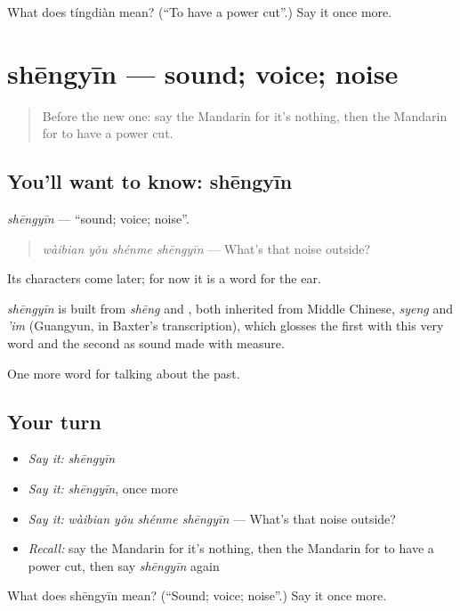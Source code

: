 \begin{tcolorbox}[breakable,colback=teal!4,colframe=teal!35!black,title={Before you move on}]
What does tíngdiàn mean? (\textquotedblleft{}To have a power cut\textquotedblright{}.) Say it once more.
\end{tcolorbox}
\section[shēngyīn]{shēngyīn — sound; voice; noise}

\label{lesson:ZH-C167-shengyin}



\begin{quote}
Before the new one: say the Mandarin for it's nothing, then the Mandarin for to have a power cut.
\end{quote}

\subsection*{You'll want to know: shēngyīn}
\emph{shēngyīn} — \textquotedblleft{}sound; voice; noise\textquotedblright{}.

\begin{quote}
\emph{wàibian yǒu shénme shēngyīn} — What's that noise outside?
\end{quote}

Its characters come later; for now it is a word for the ear.

\begin{cousinweb}
\emph{shēngyīn} is built from \emph{shēng} and , both inherited from Middle Chinese, \emph{syeng} and \emph{'im} (Guangyun, in Baxter's transcription), which glosses the first with this very word and the second as sound made with measure.
\end{cousinweb}

\begin{grammarlens}[title={What you've built}]
One more word for talking about the past.
\end{grammarlens}

\subsection*{Your turn}
\begin{itemize}
\raggedright
  \item \emph{Say it:} \emph{shēngyīn}
  \item \emph{Say it:} \emph{shēngyīn}, once more
  \item \emph{Say it:} \emph{wàibian yǒu shénme shēngyīn} — What's that noise outside?
  \item \emph{Recall:} say the Mandarin for it's nothing, then the Mandarin for to have a power cut, then say \emph{shēngyīn} again
\end{itemize}

\begin{tcolorbox}[breakable,colback=teal!4,colframe=teal!35!black,title={Before you move on}]
What does shēngyīn mean? (\textquotedblleft{}Sound; voice; noise\textquotedblright{}.) Say it once more.
\end{tcolorbox}
